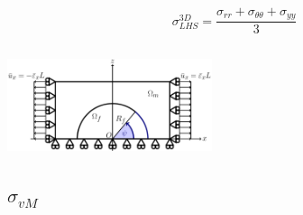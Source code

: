 \documentclass[first,firstsupp,lastsupp,last,hyperref,table]{ETHclass}
\begin{document}
\begin{frame}
\begin{columns}[c]
\begin{column}{0.5\textwidth}
\begin{figure}
\end{figure}
\vspace{-0.5cm}
\scriptsize
\begin{equation*}
\sigma^{3D}_{LHS}=\frac{\sigma_{rr}+\sigma_{\theta\theta}+\sigma_{yy}}{3}
\end{equation*}
\end{column}
\end{columns}
\vspace{-0.3cm}
\includegraphics[width=0.45\textwidth]{refAngle.pdf}
\end{frame}

\subsection{$\sigma_{vM}$}
\end{document}

